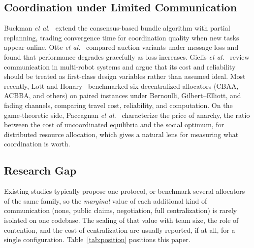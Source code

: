 \documentclass[conference]{IEEEtran}
\begin{document}
\subsection{Coordination under Limited Communication}
Buckman \emph{et al.}~\cite{buckman2019} extend the consensus-based bundle algorithm with partial replanning, trading convergence time for coordination quality when new tasks appear online. Otte \emph{et al.}~\cite{otte2020} compared auction variants under message loss and found that performance degrades gracefully as loss increases. Gielis \emph{et al.}~\cite{gielis2022} review communication in multi-robot systems and argue that its cost and reliability should be treated as first-class design variables rather than assumed ideal. Most recently, Lott and Honary~\cite{lott2026} benchmarked six decentralized allocators (CBAA, ACBBA, and others) on paired instances under Bernoulli, Gilbert--Elliott, and fading channels, comparing travel cost, reliability, and computation. On the game-theoretic side, Paccagnan \emph{et al.}~\cite{paccagnan2020} characterize the price of anarchy, the ratio between the cost of uncoordinated equilibria and the social optimum, for distributed resource allocation, which gives a natural lens for measuring what coordination is worth.

\subsection{Research Gap}
Existing studies typically propose one protocol, or benchmark several allocators of the same family, so the \emph{marginal} value of each additional kind of communication (none, public claims, negotiation, full centralization) is rarely isolated on one codebase. The scaling of that value with team size, the role of contention, and the cost of centralization are usually reported, if at all, for a single configuration. Table~\ref{tab:position} positions this paper.
\end{document}
